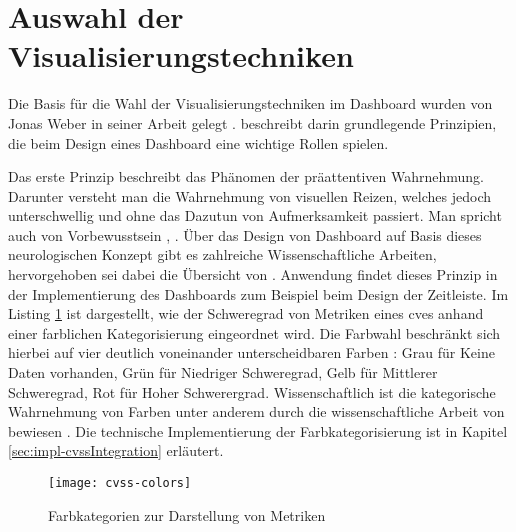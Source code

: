 \section{Auswahl der Visualisierungstechniken}
\label{sec:auswahlDerVisualisierungstechniken}
Die Basis für die Wahl der Visualisierungstechniken im Dashboard wurden von Jonas Weber in seiner Arbeit gelegt \autocite{weberEvaluationDashboardTechniques}. \citeauthor{weberEvaluationDashboardTechniques} beschreibt darin grundlegende Prinzipien, die beim Design eines Dashboard eine wichtige Rollen spielen.
\par Das erste Prinzip beschreibt das Phänomen der präattentiven Wahrnehmung. Darunter versteht man die Wahrnehmung von visuellen Reizen, welches jedoch unterschwellig und ohne das Dazutun von Aufmerksamkeit passiert. Man spricht auch von Vorbewusstsein \autocite{PraeattentiveWahrnehmung}, \autocite{mallotWahrnehmungPraeattentiveIm2021}. Über das Design von Dashboard auf Basis dieses neurologischen Konzept gibt es zahlreiche Wissenschaftliche Arbeiten, hervorgehoben sei dabei die Übersicht von \citeauthor{barrera-leonHowPreattentiveProcess2023} \autocite{barrera-leonHowPreattentiveProcess2023}. Anwendung findet dieses Prinzip in der Implementierung des Dashboards zum Beispiel beim Design der Zeitleiste. Im Listing \ref{fig:cvss-colors} ist dargestellt, wie der Schweregrad von Metriken eines \glspl{cve} anhand einer farblichen Kategorisierung eingeordnet wird. Die Farbwahl beschränkt sich hierbei auf vier deutlich voneinander unterscheidbaren Farben : Grau für Keine Daten vorhanden, Grün für Niedriger Schweregrad, Gelb für Mittlerer Schweregrad, Rot für Hoher Schwerergrad. Wissenschaftlich ist die kategorische Wahrnehmung von Farben unter anderem durch die wissenschaftliche Arbeit von \citeauthor{cliffordColorCategoriesAffect2010} bewiesen \autocite{cliffordColorCategoriesAffect2010}. Die technische Implementierung der Farbkategorisierung ist in Kapitel \ref{sec:impl-cvssIntegration} erläutert.
%
\begin{figure}[H]
    \centering
    \texttt{[image: cvss-colors]}
    \caption{Farbkategorien zur Darstellung von Metriken}
    \label{fig:cvss-colors}
\end{figure}
%
